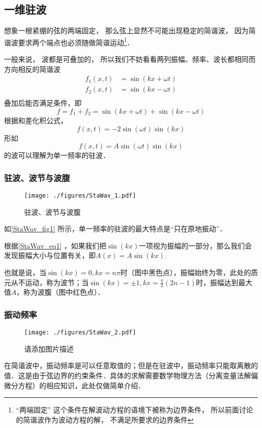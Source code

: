 
\begin{issues}
\issueDraft
\end{issues}


\subsection{一维驻波}
想象一根紧绷的弦的两端固定， 那么弦上显然不可能出现稳定的简谐波， 因为简谐波要求两个端点也必须随做简谐运动\footnote{“两端固定” 这个条件在解波动方程的语境下被称为边界条件， 所以前面讨论的简谐波作为波动方程的解， 不满足所要求的边界条件}．

一般来说， 波都是可叠加的， 所以我们不妨看看两列振幅、频率、波长都相同而方向相反的简谐波
$$
\begin{aligned}
f_1(x,t)&=\sin(kx+\omega t)\\
f_2(x,t)&=\sin(kx-\omega t)\\
\end{aligned}
$$
叠加后能否满足条件，即
$$f=f_1+f_2=\sin(kx+\omega t)+\sin(kx-\omega t)$$
根据和差化积公式，
\begin{equation}
f(x,t)=-2\sin(\omega t)\sin(kx)
\end{equation}
形如
\begin{equation}\label{StaWav_eq1}
f(x,t)=A\sin(\omega t)\sin(kx)
\end{equation}
的波可以理解为单一频率的驻波．

\subsubsection{驻波、波节与波腹}
\begin{figure}[ht]
\centering
\texttt{[image: ./figures/StaWav\_1.pdf]}
\caption{驻波、波节与波腹} \label{StaWav_fig1}
\end{figure}

如\autoref{StaWav_fig1} 所示，单一频率的驻波的最大特点是“只在原地振动”．

根据\autoref{StaWav_eq1} ，如果我们把$\sin(kx)$一项视为振幅的一部分，那么我们会发现振幅大小与位置有关，即$A(x) = A \sin(kx)$.

也就是说，当$\sin(kx)=0, kx=n\pi$时（图中黑色点），振幅始终为零，此处的质元从不运动，称为波节；当$\sin(kx)=\pm1, kx=\frac{\pi}{2} (2n-1)$时，振幅达到最大值$A$，称为波腹（图中红色点）．

\subsubsection{振动频率}
\begin{figure}[ht]
\centering
\texttt{[image: ./figures/StaWav\_2.pdf]}
\caption{请添加图片描述} \label{StaWav_fig2}
\end{figure}
在简谐波中，振动频率是可以任意取值的；但是在驻波中，振动频率只能取离散的值．这是由于弦边界的约束条件．具体的求解需要数学物理方法（分离变量法解偏微分方程）的相应知识，此处仅做简单介绍．

